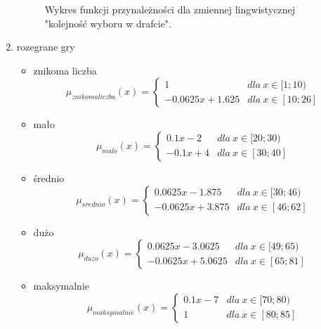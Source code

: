 \documentclass{classrep}
\begin{document}
\begin{enumerate}
\begin{figure}[H]
        \caption{Wykres funkcji przynależności dla zmiennej lingwistycznej "kolejność wyboru w drafcie".}
        \label{rysunek:draft}
    \end{figure}
    \item rozegrane gry
     \begin{itemize}
        \item znikoma liczba
        \begin{equation}
            \mu_{znikomaliczba}(x) = \left\{\begin{matrix} 1 & dla \: x\in[1;10) \\ -0.0625x + 1.625 & dla \: x\in [10; 26] \end{matrix}\right.
        \end{equation}
        \item mało
        \begin{equation}
            \mu_{malo}(x) = \left\{\begin{matrix} 0.1x - 2 & dla \: x\in[20;30) \\ -0.1x + 4 & dla \: x\in [30; 40] \end{matrix}\right.
        \end{equation}
        \item średnio
        \begin{equation}
            \mu_{srednio}(x) = \left\{\begin{matrix} 0.0625x - 1.875 & dla \: x\in[30;46) \\ -0.0625x + 3.875 & dla \: x\in [46; 62] \end{matrix}\right.
        \end{equation}
        \item dużo
        \begin{equation}
            \mu_{duzo}(x) = \left\{\begin{matrix} 0.0625x - 3.0625 & dla \: x\in[49;65) \\ -0.0625x + 5.0625 & dla \: x\in [65; 81] \end{matrix}\right.
        \end{equation}
        \item maksymalnie
        \begin{equation}
            \mu_{maksymalnie}(x) = \left\{\begin{matrix} 0.1x - 7 & dla \: x\in[70;80) \\ 1 & dla \: x\in [80;85] \end{matrix}\right.
        \end{equation}
    \end{itemize}

\end{enumerate}
\end{document}
